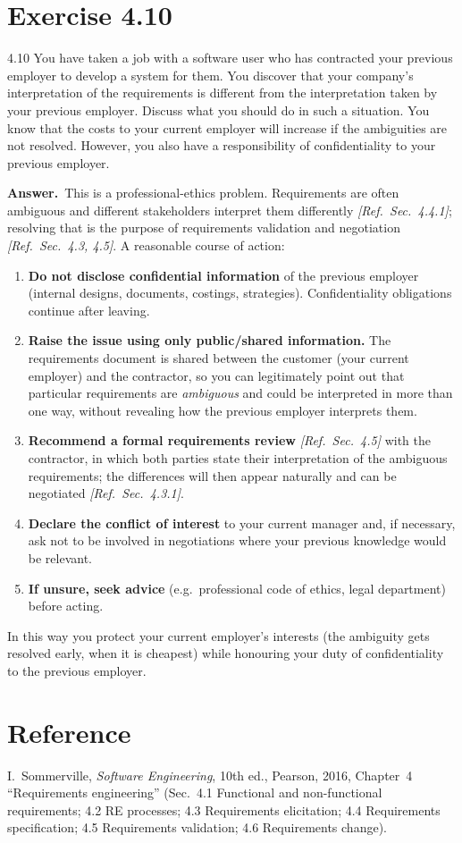 \documentclass[11pt,a4paper]{article}
\newcommand{\answer}{\par\noindent\textbf{Answer.}\ }
\newcommand{\refsec}[1]{\hfill\textit{\small[Ref.\ Sec.~#1]}}
\begin{document}
\section*{Exercise 4.10}
\begin{question}{4.10}
You have taken a job with a software user who has contracted your previous employer to develop a system
for them. You discover that your company's interpretation of the requirements is different from the
interpretation taken by your previous employer. Discuss what you should do in such a situation. You know
that the costs to your current employer will increase if the ambiguities are not resolved. However, you
also have a responsibility of confidentiality to your previous employer.
\end{question}
\answer This is a professional-ethics problem. Requirements are often ambiguous and different
stakeholders interpret them differently \refsec{4.4.1}; resolving that is the purpose of requirements
validation and negotiation \refsec{4.3, 4.5}. A reasonable course of action:
\begin{enumerate}[leftmargin=*]
  \item \textbf{Do not disclose confidential information} of the previous employer (internal
  designs, documents, costings, strategies). Confidentiality obligations continue after leaving.
  \item \textbf{Raise the issue using only public/shared information.} The requirements document is
  shared between the customer (your current employer) and the contractor, so you can legitimately point
  out that particular requirements are \emph{ambiguous} and could be interpreted in more than one way,
  without revealing how the previous employer interprets them.
  \item \textbf{Recommend a formal requirements review} \refsec{4.5} with the contractor, in which both
  parties state their interpretation of the ambiguous requirements; the differences will then appear
  naturally and can be negotiated \refsec{4.3.1}.
  \item \textbf{Declare the conflict of interest} to your current manager and, if necessary, ask not to be
  involved in negotiations where your previous knowledge would be relevant.
  \item \textbf{If unsure, seek advice} (e.g.\ professional code of ethics, legal department) before
  acting.
\end{enumerate}
In this way you protect your current employer's interests (the ambiguity gets resolved early, when it is
cheapest) while honouring your duty of confidentiality to the previous employer.

\section*{Reference}
I.~Sommerville, \emph{Software Engineering}, 10th ed., Pearson, 2016, Chapter~4 ``Requirements engineering''
(Sec.~4.1 Functional and non-functional requirements; 4.2 RE processes; 4.3 Requirements elicitation;
4.4 Requirements specification; 4.5 Requirements validation; 4.6 Requirements change).
\end{document}
